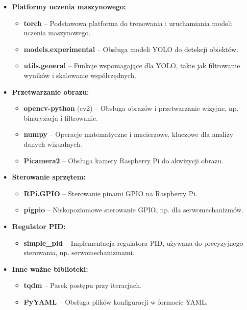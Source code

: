 \documentclass[a4paper,twoside,12pt]{book}
\begin{document}
\begin{itemize}
    \item \textbf{Platformy uczenia maszynowego:}
    \begin{itemize}
        \item \textbf{torch} – Podstawowa platforma do trenowania i uruchamiania modeli uczenia maszynowego.
        \item \textbf{models.experimental} – Obsługa modeli YOLO do detekcji obiektów.
        \item \textbf{utils.general} – Funkcje wspomagające dla YOLO, takie jak filtrowanie wyników i skalowanie współrzędnych.
    \end{itemize}
    
    \item \textbf{Przetwarzanie obrazu:}
    \begin{itemize}
        \item \textbf{opencv-python} (cv2) – Obsługa obrazów i przetwarzanie wizyjne, np. binaryzacja i filtrowanie.
        \item \textbf{numpy} – Operacje matematyczne i macierzowe, kluczowe dla analizy danych wizualnych.
        \item \textbf{Picamera2} – Obsługa kamery Raspberry Pi do akwizycji obrazu.
    \end{itemize}
    
    \item \textbf{Sterowanie sprzętem:}
    \begin{itemize}
        \item \textbf{RPi.GPIO} – Sterowanie pinami GPIO na Raspberry Pi.
        \item \textbf{pigpio} – Niskopoziomowe sterowanie GPIO, np. dla serwomechanizmów.
    \end{itemize}
    
    \item \textbf{Regulator PID:}
    \begin{itemize}
        \item \textbf{simple\_pid} – Implementacja regulatora PID, używana do precyzyjnego sterowania, np. serwomechanizmami.
    \end{itemize}
    
    \item \textbf{Inne ważne biblioteki:}
    \begin{itemize}
        \item \textbf{tqdm} – Pasek postępu przy iteracjach.
        \item \textbf{PyYAML} – Obsługa plików konfiguracji w formacie YAML.
    \end{itemize}
\end{itemize}
\end{document}
